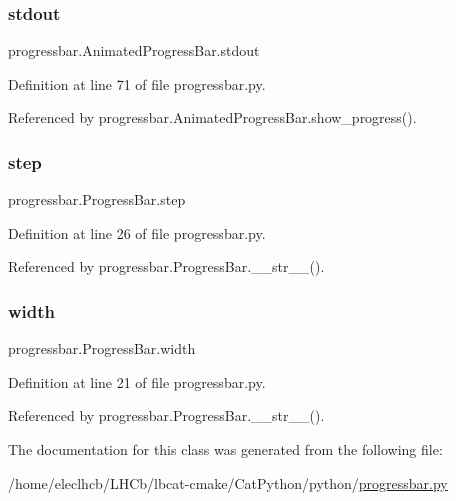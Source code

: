 \subsubsection{\texorpdfstring{stdout}{stdout}}
{\footnotesize\ttfamily progressbar.\+Animated\+Progress\+Bar.\+stdout}



Definition at line 71 of file progressbar.\+py.



Referenced by progressbar.\+Animated\+Progress\+Bar.\+show\+\_\+progress().

\mbox{\label{classprogressbar_1_1ProgressBar_ac076ee00e3a70c69b8583668c165415a}} 
\subsubsection{\texorpdfstring{step}{step}}
{\footnotesize\ttfamily progressbar.\+Progress\+Bar.\+step\hspace{0.3cm}{\ttfamily [inherited]}}



Definition at line 26 of file progressbar.\+py.



Referenced by progressbar.\+Progress\+Bar.\+\_\+\+\_\+str\+\_\+\+\_\+().

\mbox{\label{classprogressbar_1_1ProgressBar_abde0c8da19e6e6bcde845b1eb3cee279}} 
\subsubsection{\texorpdfstring{width}{width}}
{\footnotesize\ttfamily progressbar.\+Progress\+Bar.\+width\hspace{0.3cm}{\ttfamily [inherited]}}



Definition at line 21 of file progressbar.\+py.



Referenced by progressbar.\+Progress\+Bar.\+\_\+\+\_\+str\+\_\+\+\_\+().



The documentation for this class was generated from the following file\+:\begin{DoxyCompactItemize}
\item 
/home/eleclhcb/\+L\+H\+Cb/lbcat-\/cmake/\+Cat\+Python/python/\hyperlink{progressbar_8py}{progressbar.\+py}\end{DoxyCompactItemize}
